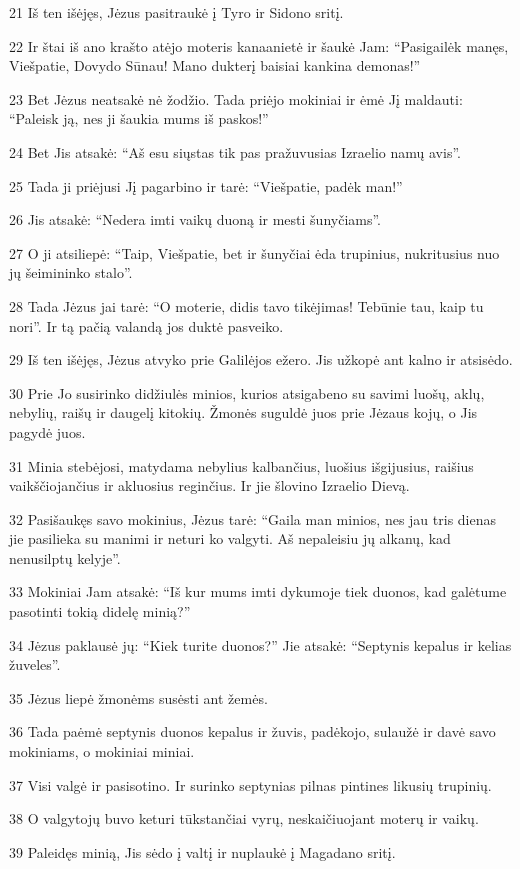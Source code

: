 \par 21 Iš ten išėjęs, Jėzus pasitraukė į Tyro ir Sidono sritį. 
\par 22 Ir štai iš ano krašto atėjo moteris kanaanietė ir šaukė Jam: “Pasigailėk manęs, Viešpatie, Dovydo Sūnau! Mano dukterį baisiai kankina demonas!” 
\par 23 Bet Jėzus neatsakė nė žodžio. Tada priėjo mokiniai ir ėmė Jį maldauti: “Paleisk ją, nes ji šaukia mums iš paskos!” 
\par 24 Bet Jis atsakė: “Aš esu siųstas tik pas pražuvusias Izraelio namų avis”. 
\par 25 Tada ji priėjusi Jį pagarbino ir tarė: “Viešpatie, padėk man!” 
\par 26 Jis atsakė: “Nedera imti vaikų duoną ir mesti šunyčiams”. 
\par 27 O ji atsiliepė: “Taip, Viešpatie, bet ir šunyčiai ėda trupinius, nukritusius nuo jų šeimininko stalo”. 
\par 28 Tada Jėzus jai tarė: “O moterie, didis tavo tikėjimas! Tebūnie tau, kaip tu nori”. Ir tą pačią valandą jos duktė pasveiko. 
\par 29 Iš ten išėjęs, Jėzus atvyko prie Galilėjos ežero. Jis užkopė ant kalno ir atsisėdo. 
\par 30 Prie Jo susirinko didžiulės minios, kurios atsigabeno su savimi luošų, aklų, nebylių, raišų ir daugelį kitokių. Žmonės suguldė juos prie Jėzaus kojų, o Jis pagydė juos. 
\par 31 Minia stebėjosi, matydama nebylius kalbančius, luošius išgijusius, raišius vaikščiojančius ir akluosius reginčius. Ir jie šlovino Izraelio Dievą. 
\par 32 Pasišaukęs savo mokinius, Jėzus tarė: “Gaila man minios, nes jau tris dienas jie pasilieka su manimi ir neturi ko valgyti. Aš nepaleisiu jų alkanų, kad nenusilptų kelyje”. 
\par 33 Mokiniai Jam atsakė: “Iš kur mums imti dykumoje tiek duonos, kad galėtume pasotinti tokią didelę minią?” 
\par 34 Jėzus paklausė jų: “Kiek turite duonos?” Jie atsakė: “Septynis kepalus ir kelias žuveles”. 
\par 35 Jėzus liepė žmonėms susėsti ant žemės. 
\par 36 Tada paėmė septynis duonos kepalus ir žuvis, padėkojo, sulaužė ir davė savo mokiniams, o mokiniai miniai. 
\par 37 Visi valgė ir pasisotino. Ir surinko septynias pilnas pintines likusių trupinių. 
\par 38 O valgytojų buvo keturi tūkstančiai vyrų, neskaičiuojant moterų ir vaikų. 
\par 39 Paleidęs minią, Jis sėdo į valtį ir nuplaukė į Magadano sritį.



